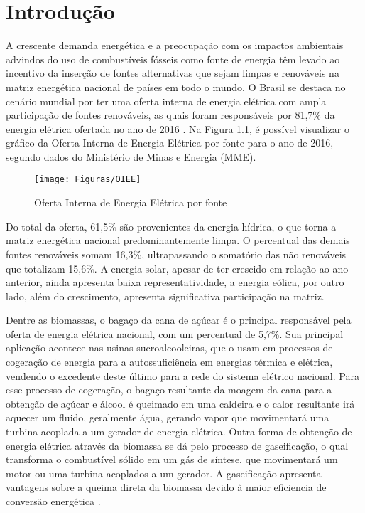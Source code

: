 \chapter[Introdução]{Introdução}

A crescente demanda energética e a preocupação com os impactos ambientais advindos do uso de combustíveis fósseis como fonte de energia têm levado ao incentivo da inserção de fontes alternativas que sejam limpas e renováveis na matriz energética nacional de países em todo o mundo. O Brasil se destaca no cenário mundial por ter uma oferta interna de energia elétrica com ampla participação de fontes renováveis, as quais foram responsáveis por 81,7\% da energia elétrica ofertada no ano de 2016 \cite{mme2017}. Na Figura \ref{figura_matriz}, é possível visualizar o gráfico da Oferta Interna de Energia Elétrica por fonte para o ano de 2016, segundo dados do Ministério de Minas e Energia (MME).

\begin{figure}[!htb]
	\centering
	\texttt{[image: Figuras/OIEE]}
	\caption{Oferta Interna de Energia Elétrica por fonte \cite{mme2017}}
	\label{figura_matriz}
\end{figure}

Do total da oferta, 61,5\% são provenientes da energia hídrica, o que torna a matriz energética nacional predominantemente limpa. O percentual das demais fontes renováveis somam 16,3\%, ultrapassando o somatório das não renováveis que totalizam 15,6\%. A energia solar, apesar de ter crescido em relação ao ano anterior, ainda apresenta baixa representatividade, a energia eólica, por outro lado, além do crescimento, apresenta significativa participação na matriz.

Dentre as biomassas, o bagaço da cana de açúcar é o principal responsável pela oferta de energia elétrica nacional, com um percentual de 5,7\%. Sua principal aplicação acontece nas usinas sucroalcooleiras, que o usam em processos de cogeração de energia para a autossuficiência em energias térmica e elétrica, vendendo o excedente deste último para a rede do sistema elétrico nacional. Para esse processo de cogeração, o bagaço resultante da moagem da cana para a obtenção de açúcar e álcool é queimado em uma caldeira e o calor resultante irá aquecer um fluido, geralmente água, gerando vapor que movimentará uma turbina acoplada a um gerador de energia elétrica. Outra forma de obtenção de energia elétrica através da biomassa se dá pelo processo de gaseificação, o qual transforma o combustível sólido em um gás de síntese, que movimentará um motor ou uma turbina acoplados a um gerador. A gaseificação apresenta vantagens sobre a queima direta da biomassa devido à maior eficiencia de conversão energética \cite{chaves2016}. 

